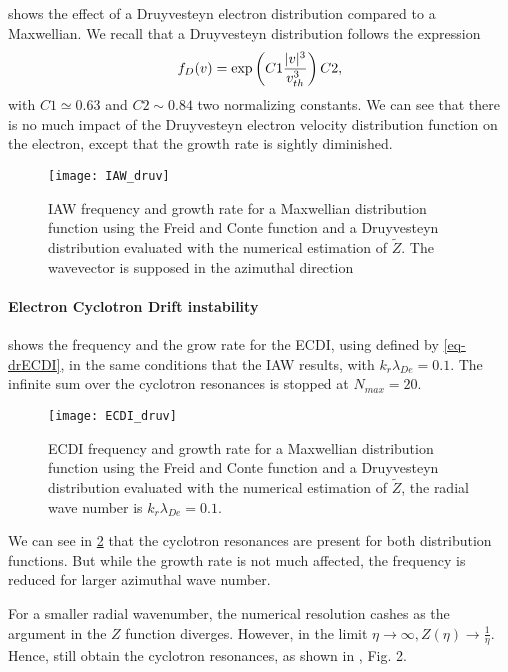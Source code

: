    shows the effect of a Druyvesteyn electron distribution compared to a Maxwellian.
  We recall that a Druyvesteyn distribution follows the expression
  \begin{equation} \label{eq-druyv}
    f_{D}(v) = \exp \left( C1 \frac{\lvert v\rvert^3}{v_{th}^3}  \right) C2,
  \end{equation}
  with $C1 \simeq 0.63$ and $C2 \sim 0.84$ two normalizing constants.
  We can see that there is no much impact of the Druyvesteyn electron velocity distribution function on the electron, except that the growth rate is sightly diminished.
  
  \begin{figure}[hbtp]
    \centering
    \texttt{[image: IAW\_druv]}
    \caption{\ac{IAW} frequency and growth rate for a Maxwellian distribution function using the Freid and Conte function and a Druyvesteyn distribution evaluated with the numerical estimation of $\tilde{Z}$. The wavevector is supposed in the azimuthal direction }
    \label{fig-IAW_druv}
  \end{figure}
  
  \paragraph{Electron Cyclotron Drift instability\\}
  
     shows the frequency and the grow rate for the \ac{ECDI}, using defined by \cref{eq-drECDI}, in the same conditions that the \ac{IAW} results, with $k_r \lambda_{De} = 0.1 $.
    The infinite sum over the cyclotron resonances is stopped at $N_{max} = 20$.
    
    
    \begin{figure}[hbtp]
    \centering
    \texttt{[image: ECDI\_druv]}
    \caption{\ac{ECDI} frequency and growth rate for a Maxwellian distribution function using the Freid and Conte function and a Druyvesteyn distribution evaluated with the numerical estimation of $\tilde{Z}$, the radial wave number is $k_r \lambda_{De} = 0.1 $.}
    \label{fig-ECDI_druv}
  \end{figure}
  
  We can see in \cref{fig-ECDI_druv} that the cyclotron resonances are present for both distribution functions.
  But while the growth rate is not much affected, the frequency is reduced for larger azimuthal wave number.
  
  For a smaller radial wavenumber, the numerical resolution cashes as the argument in the $Z$ function diverges.
  However, in the limit $\eta \rightarrow \infty, Z(\eta) \rightarrow  \frac{1}{\eta}$.
  Hence, still obtain the cyclotron resonances, as shown in \citet{janhunen2018}, Fig. 2.

